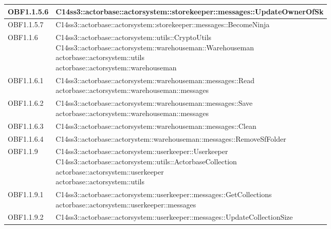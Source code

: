 \documentclass{scalatekids-article}
\begin{document}
\begin{longtable}[H]{|p{4.5cm}|p{13cm}|}
\hline
OBF1.1.5.6 & \multiLineCell[t]{C14ss3::actorbase::actorsystem::storekeeper::messages::UpdateOwnerOfSk\\}\\
\hline
OBF1.1.5.7 & \multiLineCell[t]{C14ss3::actorbase::actorsystem::storekeeper::messages::BecomeNinja\\}\\
\hline
OBF1.1.6 & \multiLineCell[t]{C14ss3::actorbase::actorsystem::utils::CryptoUtils\\C14ss3::actorbase::actorsystem::warehouseman::Warehouseman\\actorbase::actorsystem::utils\\actorbase::actorsystem::warehouseman\\}\\
\hline
OBF1.1.6.1 & \multiLineCell[t]{C14ss3::actorbase::actorsystem::warehouseman::messages::Read\\actorbase::actorsystem::warehouseman::messages\\}\\
\hline
OBF1.1.6.2 & \multiLineCell[t]{C14ss3::actorbase::actorsystem::warehouseman::messages::Save\\actorbase::actorsystem::warehouseman::messages\\}\\
\hline
OBF1.1.6.3 & \multiLineCell[t]{C14ss3::actorbase::actorsystem::warehouseman::messages::Clean\\}\\
\hline
OBF1.1.6.4 & \multiLineCell[t]{C14ss3::actorbase::actorystem::warehouseman::messages::RemoveSfFolder\\}\\
\hline
OBF1.1.9 & \multiLineCell[t]{C14ss3::actorbase::actorsystem::userkeeper::Userkeeper\\C14ss3::actorbase::actorsystem::utils::ActorbaseCollection\\actorbase::actorsystem::userkeeper\\actorbase::actorsystem::utils\\}\\
\hline
OBF1.1.9.1 & \multiLineCell[t]{C14ss3::actorbase::actorsystem::userkeeper::messages::GetCollections\\actorbase::actorsystem::userkeeper::messages\\}\\
\hline
OBF1.1.9.2 & \multiLineCell[t]{C14ss3::actorbase::actorsystem::userkeeper::messages::UpdateCollectionSize\\}\\

\end{longtable}
\end{document}
